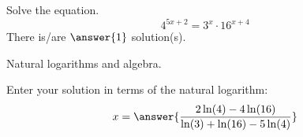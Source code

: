 \documentclass{ximera}
\author{Bobby Ramsey}
\begin{document}
\begin{exercise}
	Solve the equation.
	\[ 4^{5x+2} = 3^x \cdot 16^{x+4} \]
	There is/are $\answer{1}$ solution(s).
	\begin{hint}
		Natural logarithms and algebra.
	\end{hint}
	\begin{exercise}
		Enter your solution in terms of the natural logarithm: \[x = \answer{ \frac{2\ln(4) - 4\ln(16)}{\ln(3)+\ln(16)-5\ln(4)} }\]
	\end{exercise}
\end{exercise}
\end{document}
